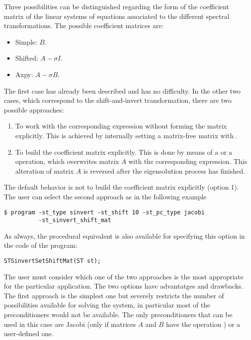 	Three possibilities can be distinguished regarding the form of the coefficient matrix of the linear systems of equations associated to the different spectral transformations. The possible coefficient matrices are:
	\begin{itemize}
	\item Simple: $B$.
	\item Shifted: $A-\sigma I$.
	\item Axpy: $A-\sigma B$.
	\end{itemize}
	The first case has already been described and has no difficulty. In the other two cases, which correspond to the shift-and-invert transformation, there are two possible approaches:
	\begin{enumerate}
	\item To work with the corresponding expression without forming the matrix explicitly. This is achieved by internally setting a matrix-free matrix with .
	\item To build the coefficient matrix explicitly. This is done by means of a  or a  operation, which overwrites matrix $A$ with the corresponding expression. This alteration of matrix $A$ is reversed after the eigensolution process has finished.
	\end{enumerate}
	The default behavior is not to build the coefficient matrix explicitly (option 1). The user can select the second approach as in the following example
\begin{Verbatim}[fontsize=\small]
	$ program -st_type sinvert -st_shift 10 -st_pc_type jacobi
		  -st_sinvert_shift_mat
\end{Verbatim}
	As always, the procedural equivalent is also available for specifying this option in the code of the program:
	\begin{Verbatim}[fontsize=\small]
	STSinvertSetShiftMat(ST st);
	\end{Verbatim}

	The user must consider which one of the two approaches is the most appropriate for the particular application. The two options have advantatges and drawbacks. The first approach is the simplest one but severely restricts the number of possibilities available for solving the system, in particular most of the \petsc{} preconditioners would not be available. The only preconditioners that can be used in this case are Jacobi (only if matrices $A$ and $B$ have the operation ) or a user-defined one.
	
